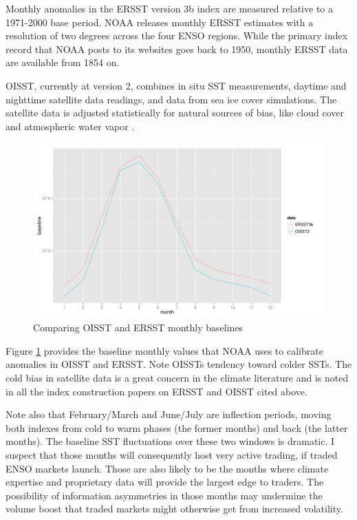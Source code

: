 \documentclass[authoryear]{article}
\begin{document}
Monthly anomalies in the ERSST version 3b index are measured relative to a 1971-2000 base period\cite{xue2003interdecadal}. NOAA releases monthly ERSST estimates with a resolution of two degrees across the four ENSO regions. While the primary index record that NOAA posts to its websites goes back to 1950, monthly ERSST data are available from 1854 on.

OISST, currently at version 2, combines in situ SST measurements, daytime and nighttime satellite data readings, and data from sea ice cover simulations. The satellite data is adjusted statistically for natural sources of bias, like cloud cover and atmospheric water vapor\cite{reynolds2002improved} \cite{reynolds1994improved} \cite{reynolds1993improved} \cite{reynolds1988real}. 

\begin{figure}[!htbp]
  \includegraphics[width=\linewidth]{Pricingfigs/CompareOISSTandERRSTbaselines}
  \caption{Comparing OISST and ERSST monthly baselines}
   \label{fig:baeslinesOIER}
\end{figure}

Figure \ref{fig:baeslinesOIER} provides the baseline monthly values that NOAA uses to calibrate anomalies in OISST and ERSST. Note OISSTs tendency toward colder SSTs. The cold bias in satellite data is a great concern in the climate literature and is noted in all the index construction papers on ERSST and OISST cited above.

Note also that February/March and June/July are inflection periods, moving both indexes from cold to warm phases (the former months) and back (the latter months). The baseline SST fluctuations over these two windows is dramatic. I suspect that those months will consequently host very active trading, if traded ENSO markets launch. Those are also likely to be the months where climate expertise and proprietary data will provide the largest edge to traders. The possibility of information asymmetries in those months may undermine the volume boost that traded markets might otherwise get from increased volatility. 
\end{document}
